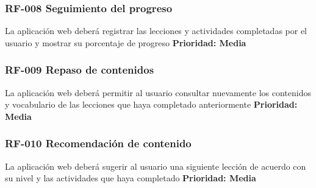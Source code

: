\subsubsection{RF-008 Seguimiento del progreso}
La aplicación web deberá registrar las lecciones y actividades completadas
por el usuario y mostrar su porcentaje de progreso
\textbf{Prioridad: Media}
\subsubsection{RF-009 Repaso de contenidos}
La aplicación web deberá permitir al usuario consultar nuevamente los
contenidos y vocabulario de las lecciones que haya completado
anteriormente
\textbf{Prioridad: Media}
\subsubsection{RF-010 Recomendación de contenido}
La aplicación web deberá sugerir al usuario una siguiente lección de
acuerdo con su nivel y las actividades que haya completado
\textbf{Prioridad: Media}